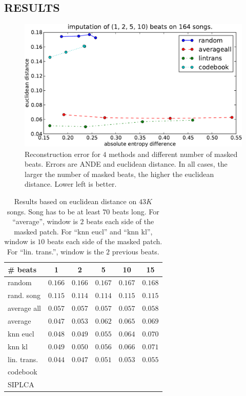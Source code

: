 \documentclass{article}
\begin{document}
\subsection{RESULTS}
\label{ssec:results}


\begin{figure}[t]
\begin{center}
\includegraphics[width=.9\columnwidth]{recon_score_in_2d}
\end{center}
\caption{Reconstruction error for $4$ methods and different
number of masked beats. Errors are ANDE and euclidean
distance. In all cases, the larger the number of masked beats,
the higher the euclidean distance. Lower left is better.
\label{fig:2dscore}}
\end{figure}


\iffalse
\begin{table}[t]
\begin{small}
\begin{center}
\begin{tabular}{l|c|c|c|c|c|}
\# beats  & 1 & 2 & 5 & 10 & 15 \\ \hline \hline
random & $0.166$ & $0.166$ & $0.167$ & $0.167$ & $0.168$  \\
rand. song & $0.115$ & $0.114$ & $0.114$ & $0.115$ & $0.115$  \\
average all & $0.057$ & $0.057$ & $0.057$ & $0.057$ & $0.058$ \\
average & $0.047$ & $0.053$ & $0.062$ & $0.065$ & $0.069$ \\ \hline
knn eucl & $0.048$ & $0.049$ & $0.055$ & $0.064$ &  $0.070$ \\
knn kl & $0.049$ & $0.050$ & $0.056$ & $0.066$ &  $0.071$ \\
lin. trans. & $\mathbf{0.044}$ & $\mathbf{0.047}$ & $\mathbf{0.051}$ & $\mathbf{0.053}$ & $\mathbf{0.055}$ \\
codebook & & & & &  \\
SIPLCA & & & & &  \\ \hline
\end{tabular}
\caption{Results based on euclidean distance on $43K$ songs.
Song has to be at least $70$ beats long. 
For ``average'', window is $2$ beats each side of the masked patch.
For ``knn eucl'' and ``knn kl'', window is $10$ beats each side of the masked patch.
For ``lin. trans.'', window is the $2$ previous beats.}
\label{tab:reseucl}
\end{center}
\end{small}
\end{table}
\end{document}
